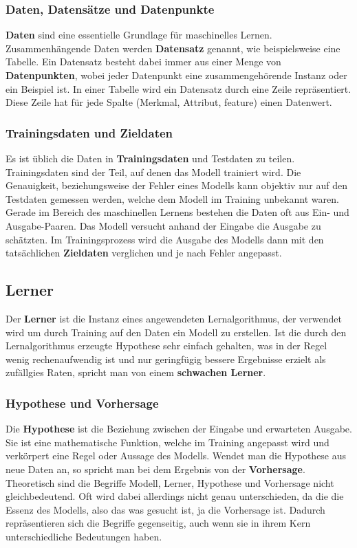 \subsubsection{Daten, Datensätze und Datenpunkte}
\textbf{Daten} sind eine essentielle Grundlage für maschinelles Lernen. Zusammenhängende Daten werden \textbf{Datensatz} genannt, wie beispielsweise eine Tabelle. Ein Datensatz besteht dabei immer aus einer Menge von \textbf{Datenpunkten}, wobei jeder Datenpunkt eine zusammengehörende Instanz oder ein Beispiel ist. In einer Tabelle wird ein Datensatz durch eine Zeile repräsentiert. Diese Zeile hat für jede Spalte (Merkmal, Attribut, feature) einen Datenwert.

\subsubsection{Trainingsdaten und Zieldaten}
Es ist üblich die Daten in \textbf{Trainingsdaten} und Testdaten zu teilen. Trainingsdaten sind der Teil, auf denen das Modell trainiert wird. Die Genauigkeit, beziehungsweise der Fehler eines Modells kann objektiv nur auf den Testdaten gemessen werden, welche dem Modell im Training unbekannt waren.
\newline
Gerade im Bereich des maschinellen Lernens bestehen die Daten oft aus Ein- und Ausgabe-Paaren. Das Modell versucht anhand der Eingabe die Ausgabe zu schätzten. Im Trainingsprozess wird die Ausgabe des Modells dann mit den tatsächlichen \textbf{Zieldaten} verglichen und je nach Fehler angepasst.

\subsection{Lerner}
Der \textbf{Lerner} ist die Instanz eines angewendeten Lernalgorithmus, der verwendet wird um durch Training auf den Daten ein Modell zu erstellen. Ist die durch den Lernalgorithmus erzeugte Hypothese sehr einfach gehalten, was in der Regel wenig rechenaufwendig ist und nur geringfügig bessere Ergebnisse erzielt als zufällgies Raten, spricht man von einem \textbf{schwachen Lerner}.

\subsubsection{Hypothese und Vorhersage}
Die \textbf{Hypothese} ist die Beziehung zwischen der Eingabe und erwarteten Ausgabe. Sie ist eine mathematische Funktion, welche im Training angepasst wird und verkörpert  eine Regel oder Aussage des Modells. 
\newline
Wendet man die Hypothese aus neue Daten an, so spricht man bei dem Ergebnis von der \textbf{Vorhersage}.
\newline
Theoretisch sind die Begriffe Modell, Lerner, Hypothese und Vorhersage nicht gleichbedeutend. Oft wird dabei allerdings nicht genau unterschieden, da die die Essenz des Modells, also das was gesucht ist, ja die Vorhersage ist. Dadurch repräsentieren sich die Begriffe gegenseitig, auch wenn sie in ihrem Kern unterschiedliche Bedeutungen haben.

